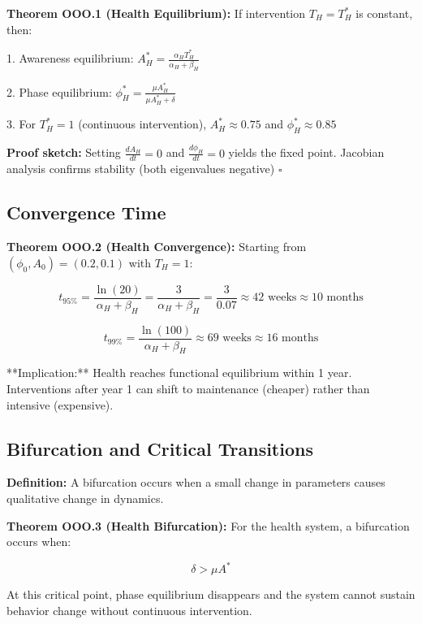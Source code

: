 \textbf{Theorem OOO.1 (Health Equilibrium):} If intervention $T_H = T^*_H$ is constant, then:

1. Awareness equilibrium: $A^*_H = \frac{\alpha_H T^*_H}{\alpha_H + \beta_H}$

2. Phase equilibrium: $\phi^*_H = \frac{\mu A^*_H}{\mu A^*_H + \delta}$

3. For $T^*_H = 1$ (continuous intervention), $A^*_H \approx 0.75$ and $\phi^*_H \approx 0.85$

\textbf{Proof sketch:} Setting $\frac{dA_H}{dt} = 0$ and $\frac{d\phi_H}{dt} = 0$ yields the fixed point. Jacobian analysis confirms stability (both eigenvalues negative) $\square$

\subsection{Convergence Time}

\textbf{Theorem OOO.2 (Health Convergence):} Starting from $(\phi_0, A_0) = (0.2, 0.1)$ with $T_H = 1$:

\begin{equation}
t_{95\%} = \frac{\ln(20)}{\alpha_H + \beta_H} = \frac{3}{\alpha_H + \beta_H} = \frac{3}{0.07} \approx 42 \text{ weeks} \approx 10 \text{ months}
\end{equation}

\begin{equation}
t_{99\%} = \frac{\ln(100)}{\alpha_H + \beta_H} \approx 69 \text{ weeks} \approx 16 \text{ months}
\end{equation}

**Implication:** Health reaches functional equilibrium within 1 year. Interventions after year 1 can shift to maintenance (cheaper) rather than intensive (expensive).

\subsection{Bifurcation and Critical Transitions}

\textbf{Definition:} A bifurcation occurs when a small change in parameters causes qualitative change in dynamics.

\textbf{Theorem OOO.3 (Health Bifurcation):} For the health system, a bifurcation occurs when:

\begin{equation}
\delta > \mu A^*
\end{equation}

At this critical point, phase equilibrium disappears and the system cannot sustain behavior change without continuous intervention.

